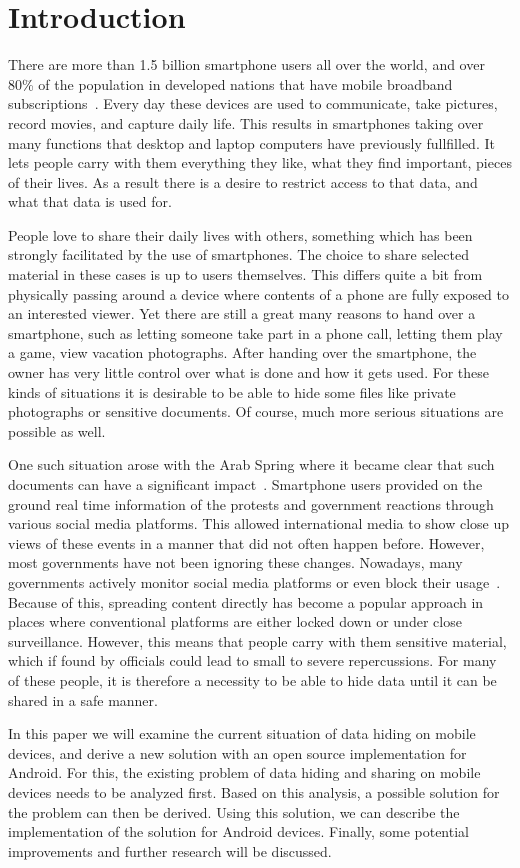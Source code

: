 \section{Introduction}
\label{sec:introduction}
There are more than 1.5 billion smartphone users all over the world\cite{smartphoneUsage}, and over 80\% of the population in developed nations that have mobile broadband subscriptions~\cite{mobileBroadband}.
Every day these devices are used to communicate, take pictures, record movies, and capture daily life.
This results in smartphones taking over many functions that desktop and laptop computers have previously fullfilled.
It lets people carry with them everything they like, what they find important, pieces of their lives.
As a result there is a desire to restrict access to that data, and what that data is used for.

People love to share their daily lives with others, something which has been strongly facilitated by the use of smartphones.
The choice to share selected material in these cases is up to users themselves. 
This differs quite a bit from physically passing around a device where contents of a phone are fully exposed to an interested viewer.
Yet there are still a great many reasons to hand over a smartphone, such as letting someone take part in a phone call, letting them play a game, view vacation photographs.
After handing over the smartphone, the owner has very little control over what is done and how it gets used.
For these kinds of situations it is desirable to be able to hide some files like private photographs or sensitive documents.
Of course, much more serious situations are possible as well.

One such situation arose with the Arab Spring where it became clear that such documents can have a significant impact~\cite{arabSpring}.
Smartphone users provided on the ground real time information of the protests and government reactions through various social media platforms.
This allowed international media to show close up views of these events in a manner that did not often happen before.
However, most governments have not been ignoring these changes.
Nowadays, many governments actively monitor social media platforms or even block their usage~\cite{cyberResponseGovernment}.
Because of this, spreading content directly has become a popular approach in places where conventional platforms are either locked down or under close surveillance.
However, this means that people carry with them sensitive material, which if found by officials could lead to small to severe repercussions.
For many of these people, it is therefore a necessity to be able to hide data until it can be shared in a safe manner.

In this paper we will examine the current situation of data hiding on mobile devices, and derive a new solution with an open source implementation for Android.
For this, the existing problem of data hiding and sharing on mobile devices needs to be analyzed first.
Based on this analysis, a possible solution for the problem can then be derived.
Using this solution, we can describe the implementation of the solution for Android devices.
Finally, some potential improvements and further research will be discussed.
